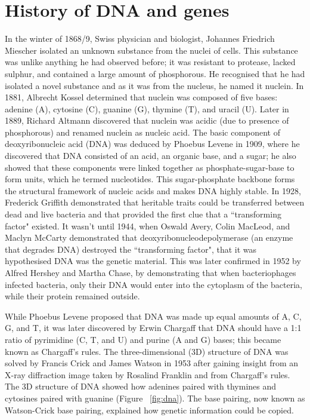 \section{History of DNA and genes}

In the winter of 1868/9, Swiss physician and biologist, Johannes Friedrich Miescher isolated an unknown substance from the nuclei of cells\cite{dahm2008discovering}. This substance was unlike anything he had observed before; it was resistant to protease, lacked sulphur, and contained a large amount of phosphorous. He recognised that he had isolated a novel substance and as it was from the nucleus, he named it nuclein. In 1881, Albrecht Kossel determined that nuclein was composed of five bases: adenine (A), cytosine (C), guanine (G), thymine (T), and uracil (U). Later in 1889, Richard Altmann discovered that nuclein was acidic (due to presence of phosphorous) and renamed nuclein as nucleic acid. The basic component of deoxyribonucleic acid (DNA) was deduced by Phoebus Levene in 1909, where he discovered that DNA consisted of an acid, an organic base, and a sugar; he also showed that these components were linked together as phosphate-sugar-base to form units, which he termed nucleotides. This sugar-phosphate backbone forms the structural framework of nucleic acids and makes DNA highly stable. In 1928, Frederick Griffith demonstrated that heritable traits could be transferred between dead and live bacteria and that provided the first clue that a ``transforming factor" existed\cite{griffith1928significance}. It wasn't until 1944, when Oswald Avery, Colin MacLeod, and Maclyn McCarty demonstrated that deoxyribonucleodepolymerase (an enzyme that degrades DNA) destroyed the ``transforming factor", that it was hypothesised DNA was the genetic material\cite{avery1944studies}. This was later confirmed in 1952 by Alfred Hershey and Martha Chase, by demonstrating that when bacteriophages infected bacteria, only their DNA would enter into the cytoplasm of the bacteria, while their protein remained outside\cite{hershey1952independent}.

While Phoebus Levene proposed that DNA was made up equal amounts of A, C, G, and T, it was later discovered by Erwin Chargaff that DNA should have a 1:1 ratio of pyrimidine (C, T, and U) and purine (A and G) bases\cite{pmid14938364, pmid14945441}; this became known as Chargaff's rules. The three-dimensional (3D) structure of DNA was solved by Francis Crick and James Watson in 1953\cite{WATSON_1953} after gaining insight from an X-ray diffraction image taken by Rosalind Franklin and from Chargaff's rules. The 3D structure of DNA showed how adenines paired with thymines and cytosines paired with guanine (Figure ~\ref{fig:dna}). The base pairing, now known as Watson-Crick base pairing, explained how genetic information could be copied.

